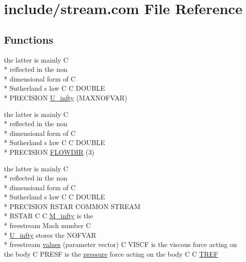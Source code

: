 \hypertarget{stream_8com}{\section{include/stream.com File Reference}
\label{stream_8com}
}
\subsection*{Functions}
\begin{DoxyCompactItemize}
\item 
the latter is mainly C \\*
reflected in the non \\*
dimensional form of C \\*
Sutherland s law C C D\-O\-U\-B\-L\-E \\*
P\-R\-E\-C\-I\-S\-I\-O\-N \hyperlink{stream_8com_a3306f725a42d6173548f0867aa4313ef}{U\-\_\-infty} (M\-A\-X\-N\-O\-F\-V\-A\-R)
\item 
the latter is mainly C \\*
reflected in the non \\*
dimensional form of C \\*
Sutherland s law C C D\-O\-U\-B\-L\-E \\*
P\-R\-E\-C\-I\-S\-I\-O\-N \hyperlink{stream_8com_a52f84db6b16caac3d51050972a7612c7}{F\-L\-O\-W\-D\-I\-R} (3)
\item 
the latter is mainly C \\*
reflected in the non \\*
dimensional form of C \\*
Sutherland s law C C D\-O\-U\-B\-L\-E \\*
P\-R\-E\-C\-I\-S\-I\-O\-N R\-S\-T\-A\-R C\-O\-M\-M\-O\-N S\-T\-R\-E\-A\-M \\*
R\-S\-T\-A\-R C C \hyperlink{stream_8com_a57c765efd76d44669f6966962bda2d72}{M\-\_\-infty} is the \\*
freestream Mach number C \\*
\hyperlink{stream_8com_a3306f725a42d6173548f0867aa4313ef}{U\-\_\-infty} stores the N\-O\-F\-V\-A\-R \\*
freestream \hyperlink{stream_8com_a22b47c1ea15673229d9e1b63dd1c114e}{values} (parameter vector) C V\-I\-S\-C\-F is the viscous force acting on the body C P\-R\-E\-S\-F is the \hyperlink{streamplasma_8com_a061f6a0622bc09f6559b154216c21ace}{pressure} force acting on the body C C \hyperlink{stream_8com_a8c4a60ca1b033fbd4e2cadaf15146ca5}{T\-R\-E\-F}
\end{DoxyCompactItemize}
